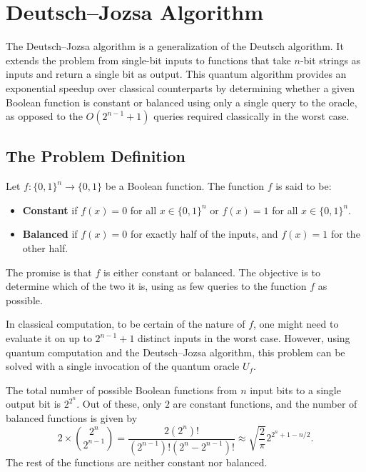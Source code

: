 \chapter{Deutsch–Jozsa Algorithm}

The Deutsch–Jozsa algorithm is a generalization of the Deutsch algorithm. It extends the problem from single-bit inputs to functions that take \( n \)-bit strings as inputs and return a single bit as output. This quantum algorithm provides an exponential speedup over classical counterparts by determining whether a given Boolean function is constant or balanced using only a single query to the oracle, as opposed to the \( O(2^{n-1}+1) \) queries required classically in the worst case.

\section{The Problem Definition}

\begin{definition}
Let \( f : \{0,1\}^n \rightarrow \{0,1\} \) be a Boolean function. The function \( f \) is said to be:
\begin{itemize}
    \item \textbf{Constant} if \( f(x) = 0 \) for all \( x \in \{0,1\}^n \) or \( f(x) = 1 \) for all \( x \in \{0,1\}^n \).
    \item \textbf{Balanced} if \( f(x) = 0 \) for exactly half of the inputs, and \( f(x) = 1 \) for the other half.
\end{itemize}
The promise is that \( f \) is either constant or balanced. The objective is to determine which of the two it is, using as few queries to the function \( f \) as possible.
\end{definition}

In classical computation, to be certain of the nature of \( f \), one might need to evaluate it on up to \( 2^{n-1} + 1 \) distinct inputs in the worst case. However, using quantum computation and the Deutsch–Jozsa algorithm, this problem can be solved with a single invocation of the quantum oracle \( U_f \).

The total number of possible Boolean functions from \( n \) input bits to a single output bit is \( 2^{2^n} \). Out of these, only \( 2 \) are constant functions, and the number of balanced functions is given by
\[
2 \times \binom{2^n}{2^{n-1}} = \frac{2(2^n)!}{(2^{n-1})!(2^n - 2^{n-1})!} \approx \sqrt{\frac{{2}}{\pi}}2^{2^n+1-n/2}.
\]
The rest of the functions are neither constant nor balanced.

